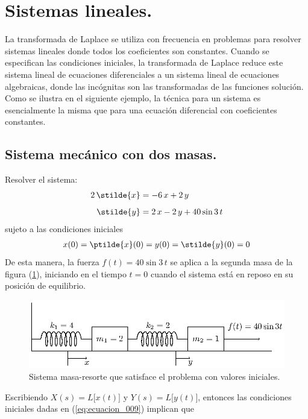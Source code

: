 \section{Sistemas lineales.}

La transformada de Laplace se utiliza con frecuencia en problemas para resolver sistemas lineales donde todos los coeficientes son constantes. Cuando se especifican las condiciones iniciales, la transformada de Laplace reduce este sistema lineal de ecuaciones diferenciales a un sistema lineal de ecuaciones algebraicas, donde las incógnitas son las transformadas de las funciones solución. Como se ilustra en el siguiente ejemplo, la técnica para un sistema es esencialmente la misma que para una ecuación diferencial con coeficientes constantes.
\subsection{Sistema mecánico con dos masas.}
Resolver el sistema:
\begin{align}
\begin{aligned}
2 \, \stilde{x} &=  - 6 \, x + 2 \, y \\[0.5em]
\stilde{y} &= 2 \, x - 2 \, y + 40 \sin 3 \, t
\end{aligned}
\label{eq:ecuacion_008}
\end{align}
sujeto a las condiciones iniciales
\begin{align}
x(0) = \ptilde{x} (0) = y(0) = \stilde{y} (0) = 0
\label{eq:ecuacion_009}
\end{align}
De esta manera, la fuerza $f(t) = 40 \sin 3 \, t$ se aplica a la segunda masa de la figura (\ref{fig:figura_005}), iniciando en el tiempo $t=0$ cuando el sistema está en reposo en su posición de equilibrio.
\begin{figure}[H]
    \centering
    \includegraphics[scale=1.3]{Imagenes/sist_dos_masas.eps}
    \caption{Sistema masa-resorte que satisface el problema con valores iniciales.}
    \label{fig:figura_005}
\end{figure}
Escribiendo $X(s) = L \big[x(t)\big]$ y $Y(s) = L \big[y(t)\big]$, entonces las condiciones iniciales dadas en (\ref{eq:ecuacion_009}) implican que
